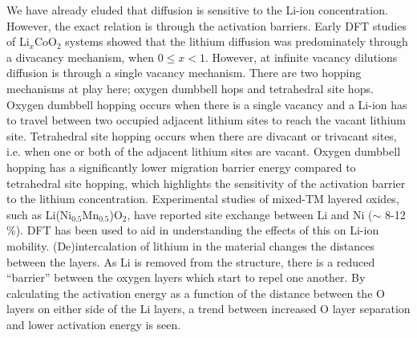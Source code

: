 \documentclass[../main.tex]{subfiles}
\begin{document}
We have already eluded that diffusion is sensitive to the Li-ion concentration. However, the exact relation is through the activation barriers. Early DFT studies \cite{van2000lithium,van2001lithium} of Li$_x$CoO$_2$ systems showed that the lithium diffusion was predominately through a divacancy mechanism, when $0\leq x < 1$. However, at infinite vacancy dilutions diffusion is through a single vacancy mechanism. \cite{islam2014lithium} There are two hopping mechanisms at play here; oxygen dumbbell hops and tetrahedral site hops. Oxygen dumbbell hopping occurs when there is a single vacancy and a Li-ion has to travel between two occupied adjacent lithium sites to reach the vacant lithium site. Tetrahedral site hopping occurs when there are divacant or trivacant sites, i.e.  when one or both of the adjacent lithium sites are vacant. \cite{van2001lithium} Oxygen dumbbell hopping has a significantly lower migration barrier energy compared to tetrahedral site hopping, which highlights the sensitivity of the activation barrier to the lithium concentration. Experimental studies of mixed-TM layered oxides, such as Li(Ni$_{0.5}$Mn$_{0.5}$)O$_2$, have reported site exchange between Li and Ni ($\sim$ 8-12 \%).\cite{choi2005structural} DFT has been used to aid in understanding the effects of this on Li-ion mobility. \cite{kang2006electrodes,laubach2009structure} (De)intercalation of lithium in the material changes the distances between the layers. As Li is removed from the structure, there is a reduced ``barrier'' between the oxygen layers which start to repel one another. By calculating the activation energy as a function of the distance between the O layers on either side of the Li layers, a trend between increased O layer separation and lower activation energy is seen. \cite{kang2006electrodes,laubach2009structure}
\end{document}
